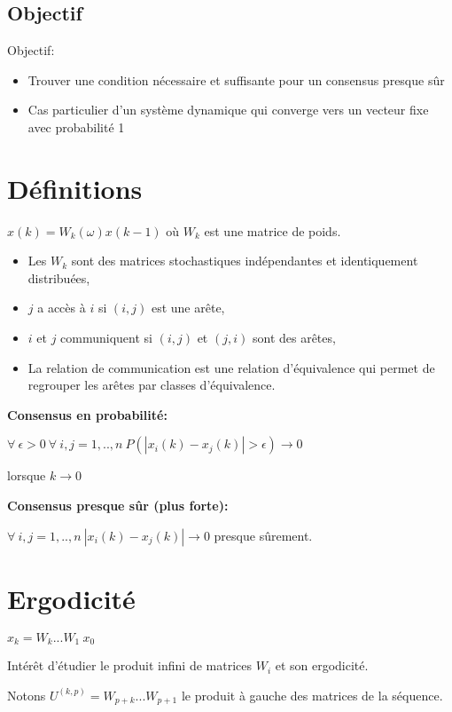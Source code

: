 \documentclass{beamer}
\begin{document}
	\subsection{Objectif}

\begin{frame}
	Objectif:
	\begin{itemize}
		\item Trouver une condition nécessaire et suffisante pour un consensus presque sûr
		\item Cas particulier d'un système dynamique qui converge vers un vecteur fixe avec probabilité 1
	\end{itemize}
\end{frame}
		
\section{Définitions}
\begin{frame}
	$ x(k) = W_k(\omega)x(k-1)$ où $W_k$ est une matrice de poids.
	
	\begin{itemize}
		\item Les $W_k$ sont des matrices stochastiques indépendantes et identiquement distribuées,
		\item $j$ a accès à $i$ si $(i,j)$ est une arête,
		\item $i$ et $j$ communiquent si $(i,j)$ et $(j,i)$ sont des arêtes,
		\item La relation de communication est une relation d'équivalence qui permet de regrouper les arêtes par classes d'équivalence.
	\end{itemize}
\end{frame}

\begin{frame}
	\textbf{Consensus en probabilité:}
	
	$\forall\ \epsilon > 0\ \forall\ i,j = 1,..,n\ P(|x_i(k) - x_j(k)| > \epsilon) \rightarrow 0$
	
	lorsque $k \rightarrow 0$
	
	\bigbreak
	
	\pause
	
	
	\textbf{Consensus presque sûr (plus forte):}
	
	$\forall\ i,j = 1,..,n\ |x_i(k) - x_j(k)|\rightarrow 0$ presque sûrement.
\end{frame}

\section{Ergodicité}
\begin{frame}
	$x_k = W_k ... W_1\ x_0$
	
	\bigbreak
	
	Intérêt d'étudier le produit infini de matrices $W_i$ et son ergodicité.
	
	\bigbreak
		
	Notons $U^{(k, p)} = W_{p+k}...W_{p+1}$ le produit à gauche des matrices de la séquence.
\end{frame}
\end{document}
